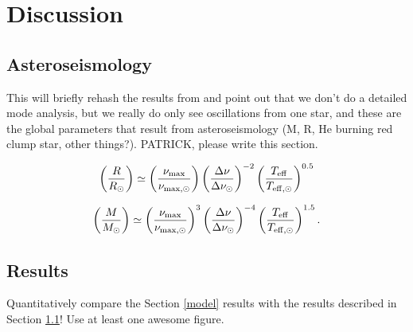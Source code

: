 \section{Discussion}\label{discuss}

\subsection{Asteroseismology}\label{seismo}
This will briefly rehash the results from \citet{gau14} and point out that we don't do a detailed mode analysis, but we really do only see oscillations from one star, and these are the global parameters that result from asteroseismology (M, R, He burning red clump star, other things?). PATRICK, please write this section.

\begin{equation}
\left( \frac{R}{R_\odot} \right) \simeq \left( \frac{\nu_{\rm{max}}}{\nu_{\rm{max,\odot}}} \right) \left( \frac{\Delta \nu}{\Delta \nu_\odot} \right)^{-2} \left( \frac{T_{\rm{eff}}}{T_{\rm{eff,\odot}}} \right)^{0.5}
\end{equation}

\begin{equation}
\left( \frac{M}{M_\odot} \right) \simeq \left( \frac{\nu_{\rm{max}}}{\nu_{\rm{max,\odot}}} \right)^3 \left( \frac{\Delta \nu}{\Delta \nu_\odot} \right)^{-4} \left( \frac{T_{\rm{eff}}}{T_{\rm{eff,\odot}}} \right)^{1.5}.
\end{equation}



%

\subsection{Results}\label{results}
Quantitatively compare the Section \ref{model} results with the \citet{gau14} results described in Section \ref{seismo}! Use at least one awesome figure.

%
